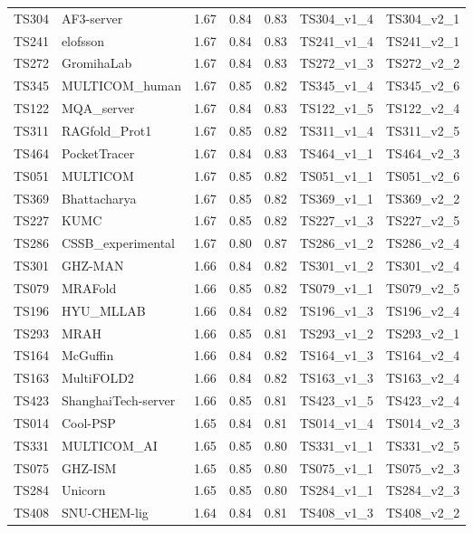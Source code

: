 \begin{table}[ht]
{\begin{tabular}{llrrrll}
TS304 & AF3-server & 1.67 & 0.84 & 0.83 & TS304\_v1\_4 & TS304\_v2\_1 \\ 
TS241 & elofsson & 1.67 & 0.84 & 0.83 & TS241\_v1\_4 & TS241\_v2\_1 \\ 
TS272 & GromihaLab & 1.67 & 0.84 & 0.83 & TS272\_v1\_3 & TS272\_v2\_2 \\ 
TS345 & MULTICOM\_human & 1.67 & 0.85 & 0.82 & TS345\_v1\_4 & TS345\_v2\_6 \\ 
TS122 & MQA\_server & 1.67 & 0.84 & 0.83 & TS122\_v1\_5 & TS122\_v2\_4 \\ 
TS311 & RAGfold\_Prot1 & 1.67 & 0.85 & 0.82 & TS311\_v1\_4 & TS311\_v2\_5 \\ 
TS464 & PocketTracer & 1.67 & 0.84 & 0.83 & TS464\_v1\_1 & TS464\_v2\_3 \\ 
TS051 & MULTICOM & 1.67 & 0.85 & 0.82 & TS051\_v1\_1 & TS051\_v2\_6 \\ 
TS369 & Bhattacharya & 1.67 & 0.85 & 0.82 & TS369\_v1\_1 & TS369\_v2\_2 \\ 
TS227 & KUMC & 1.67 & 0.85 & 0.82 & TS227\_v1\_3 & TS227\_v2\_5 \\ 
TS286 & CSSB\_experimental & 1.67 & 0.80 & 0.87 & TS286\_v1\_2 & TS286\_v2\_4 \\ 
TS301 & GHZ-MAN & 1.66 & 0.84 & 0.82 & TS301\_v1\_2 & TS301\_v2\_4 \\ 
TS079 & MRAFold & 1.66 & 0.85 & 0.82 & TS079\_v1\_1 & TS079\_v2\_5 \\ 
TS196 & HYU\_MLLAB & 1.66 & 0.84 & 0.82 & TS196\_v1\_3 & TS196\_v2\_4 \\ 
TS293 & MRAH & 1.66 & 0.85 & 0.81 & TS293\_v1\_2 & TS293\_v2\_1 \\ 
TS164 & McGuffin & 1.66 & 0.84 & 0.82 & TS164\_v1\_3 & TS164\_v2\_4 \\ 
TS163 & MultiFOLD2 & 1.66 & 0.84 & 0.82 & TS163\_v1\_3 & TS163\_v2\_4 \\ 
TS423 & ShanghaiTech-server & 1.66 & 0.85 & 0.81 & TS423\_v1\_5 & TS423\_v2\_4 \\ 
TS014 & Cool-PSP & 1.65 & 0.84 & 0.81 & TS014\_v1\_4 & TS014\_v2\_3 \\ 
TS331 & MULTICOM\_AI & 1.65 & 0.85 & 0.80 & TS331\_v1\_1 & TS331\_v2\_5 \\ 
TS075 & GHZ-ISM & 1.65 & 0.85 & 0.80 & TS075\_v1\_1 & TS075\_v2\_3 \\ 
TS284 & Unicorn & 1.65 & 0.85 & 0.80 & TS284\_v1\_1 & TS284\_v2\_3 \\ 
TS408 & SNU-CHEM-lig & 1.64 & 0.84 & 0.81 & TS408\_v1\_3 & TS408\_v2\_2 \\ 

\end{tabular}}
\end{table}
